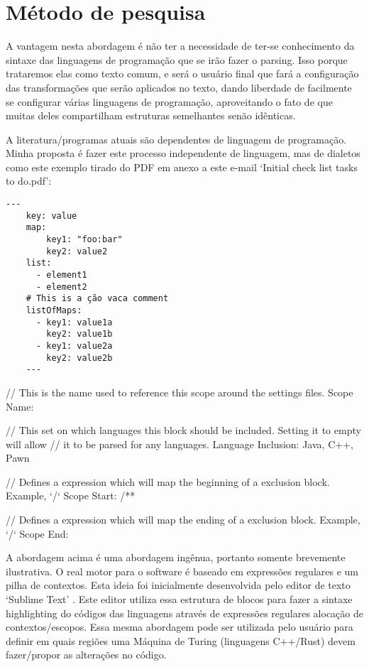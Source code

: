 


\section{Método de pesquisa}

    A vantagem nesta abordagem é não ter a necessidade de ter-se conhecimento da sintaxe das linguagens
    de programação que se irão fazer o parsing. Isso porque trataremos elas como texto comum, e será
    o usuário final que fará a configuração das transformações que serão aplicados no texto, dando
    liberdade de facilmente se configurar várias linguagens de programação, aproveitando o fato de que
    muitas deles compartilham estruturas semelhantes senão idênticas.

    A literatura/programas atuais são dependentes de linguagem de programação. Minha proposta é fazer este
    processo independente de linguagem, mas de dialetos como este exemplo tirado do PDF em anexo a este e-mail
    `Initial check list tasks to do.pdf':

    \begin{lstlisting}[style=yaml_style]
    ---
    key: value
    map:
        key1: "foo:bar"
        key2: value2
    list:
      - element1
      - element2
    # This is a ção vaca comment
    listOfMaps:
      - key1: value1a
        key2: value1b
      - key1: value2a
        key2: value2b
    ---

    \end{lstlisting}
    // This is the name used to reference this scope around the settings files.
    Scope Name:

    // This set on which languages this block should be included. Setting it to empty will allow
    // it to be parsed for any languages.
    Language Inclusion:
    Java, C++, Pawn

    // Defines a expression which will map the beginning of a exclusion block. Example, `/\*\*`
    Scope Start:
    /**

    // Defines a expression which will map the ending of a exclusion block. Example, `\*/`
    Scope End:
    \*


    \vspace*{-4mm}
    A abordagem acima é uma abordagem ingênua, portanto somente brevemente ilustrativa. O real motor
    para o software é baseado em expressões regulares e um pilha de contextos. Esta ideia foi
    inicialmente desenvolvida pelo editor de texto `Sublime Text' \cite{Skinner}. Este editor
    utiliza essa estrutura de blocos para fazer a sintaxe highlighting do códigos das linguagens
    através de expressões regulares alocação de contextos/escopos. Essa mesma abordagem pode ser
    utilizada pelo usuário para definir em quais regiões uma Máquina de Turing (linguagens C++/Rust)
    devem fazer/propor as alterações no código.

